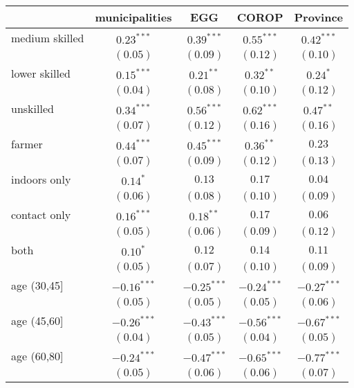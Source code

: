 
\begin{table}
\begin{center}
\begin{tabular}{l c c c c}
\hline
 & municipalities & EGG & COROP & Province \\
\hline
medium skilled & $0.23^{***}$  & $0.39^{***}$  & $0.55^{***}$  & $0.42^{***}$  \\
               & $(0.05)$      & $(0.09)$      & $(0.12)$      & $(0.10)$      \\
lower skilled  & $0.15^{***}$  & $0.21^{**}$   & $0.32^{**}$   & $0.24^{*}$    \\
               & $(0.04)$      & $(0.08)$      & $(0.10)$      & $(0.12)$      \\
unskilled      & $0.34^{***}$  & $0.56^{***}$  & $0.62^{***}$  & $0.47^{**}$   \\
               & $(0.07)$      & $(0.12)$      & $(0.16)$      & $(0.16)$      \\
farmer         & $0.44^{***}$  & $0.45^{***}$  & $0.36^{**}$   & $0.23$        \\
               & $(0.07)$      & $(0.09)$      & $(0.12)$      & $(0.13)$      \\
indoors only   & $0.14^{*}$    & $0.13$        & $0.17$        & $0.04$        \\
               & $(0.06)$      & $(0.08)$      & $(0.10)$      & $(0.09)$      \\
contact only   & $0.16^{***}$  & $0.18^{**}$   & $0.17$        & $0.06$        \\
               & $(0.05)$      & $(0.06)$      & $(0.09)$      & $(0.12)$      \\
both           & $0.10^{*}$    & $0.12$        & $0.14$        & $0.11$        \\
               & $(0.05)$      & $(0.07)$      & $(0.10)$      & $(0.09)$      \\
age (30,45]    & $-0.16^{***}$ & $-0.25^{***}$ & $-0.24^{***}$ & $-0.27^{***}$ \\
               & $(0.05)$      & $(0.05)$      & $(0.05)$      & $(0.06)$      \\
age (45,60]    & $-0.26^{***}$ & $-0.43^{***}$ & $-0.56^{***}$ & $-0.67^{***}$ \\
               & $(0.04)$      & $(0.05)$      & $(0.04)$      & $(0.05)$      \\
age (60,80]    & $-0.24^{***}$ & $-0.47^{***}$ & $-0.65^{***}$ & $-0.77^{***}$ \\
               & $(0.05)$      & $(0.06)$      & $(0.06)$      & $(0.07)$      \\

\end{tabular}
\end{center}
\end{table}
